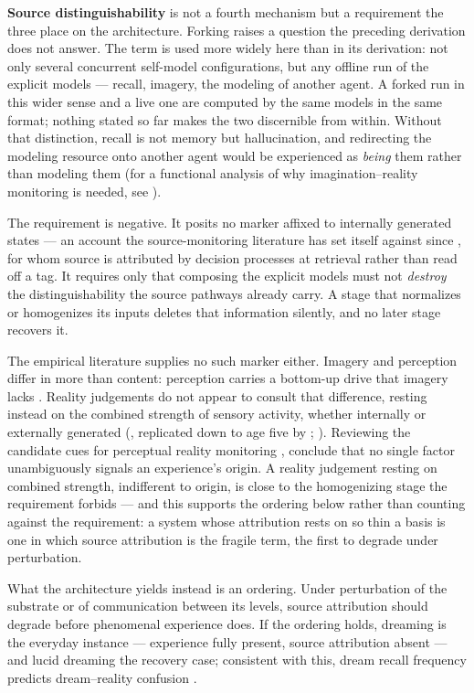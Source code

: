\documentclass[12pt]{article}
\begin{document}
\textbf{Source distinguishability} is not a fourth mechanism but a requirement the three place on the architecture. Forking raises a question the preceding derivation does not answer. The term is used more widely here than in its derivation: not only several concurrent self-model configurations, but any offline run of the explicit models — recall, imagery, the modeling of another agent. A forked run in this wider sense and a live one are computed by the same models in the same format; nothing stated so far makes the two discernible from within. Without that distinction, recall is not memory but hallucination, and redirecting the modeling resource onto another agent would be experienced as \emph{being} them rather than modeling them (for a functional analysis of why imagination--reality monitoring is needed, see \citealp{DijkstraFlemingShea2026}).

The requirement is negative. It posits no marker affixed to internally generated states --- an account the source-monitoring literature has set itself against since \citet{Johnson1993}, for whom source is attributed by decision processes at retrieval rather than read off a tag. It requires only that composing the explicit models must not \emph{destroy} the distinguishability the source pathways already carry. A stage that normalizes or homogenizes its inputs deletes that information silently, and no later stage recovers it.

The empirical literature supplies no such marker either. Imagery and perception differ in more than content: perception carries a bottom-up drive that imagery lacks \citep{Dijkstra2017}. Reality judgements do not appear to consult that difference, resting instead on the combined strength of sensory activity, whether internally or externally generated (\citealp{DijkstraFleming2023}, replicated down to age five by \citealp{Sahakian2026}; \citealp{Dijkstra2025}). Reviewing the candidate cues for perceptual reality monitoring \citep{Lau2022}, \citet{Dijkstra2022} conclude that no single factor unambiguously signals an experience's origin. A reality judgement resting on combined strength, indifferent to origin, is close to the homogenizing stage the requirement forbids --- and this supports the ordering below rather than counting against the requirement: a system whose attribution rests on so thin a basis is one in which source attribution is the fragile term, the first to degrade under perturbation.

What the architecture yields instead is an ordering. Under perturbation of the substrate or of communication between its levels, source attribution should degrade before phenomenal experience does. If the ordering holds, dreaming is the everyday instance --- experience fully present, source attribution absent --- and lucid dreaming the recovery case; consistent with this, dream recall frequency predicts dream--reality confusion \citep{Tzioridou2026}.
\end{document}
